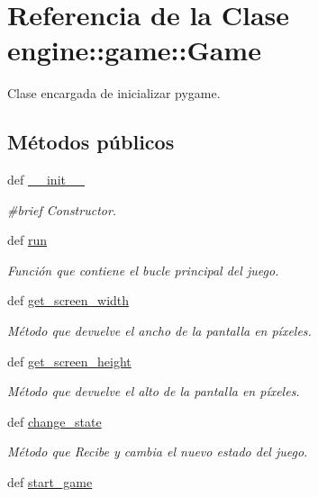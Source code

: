 \hypertarget{classengine_1_1game_1_1Game}{
\section{\-Referencia de la \-Clase engine\-:\-:game\-:\-:\-Game}
\label{classengine_1_1game_1_1Game}
}


\-Clase encargada de inicializar pygame.  


\subsection*{\-Métodos públicos}
\begin{DoxyCompactItemize}
\item 
def \hyperlink{classengine_1_1game_1_1Game_ae313f460dfb01ae1084428e296a3fc8d}{\-\_\-\-\_\-init\-\_\-\-\_\-}
\begin{DoxyCompactList}\small\item\em \#brief \-Constructor. \end{DoxyCompactList}\item 
def \hyperlink{classengine_1_1game_1_1Game_ac5f93b8b93831cc0b91141bb9101e367}{run}
\begin{DoxyCompactList}\small\item\em \-Función que contiene el bucle principal del juego. \end{DoxyCompactList}\item 
def \hyperlink{classengine_1_1game_1_1Game_a58a0f676e7cf4578d47fd9d8eeeaf3b3}{get\-\_\-screen\-\_\-width}
\begin{DoxyCompactList}\small\item\em \-Método que devuelve el ancho de la pantalla en píxeles. \end{DoxyCompactList}\item 
def \hyperlink{classengine_1_1game_1_1Game_afd74e949d78a96ec9322958a153c8795}{get\-\_\-screen\-\_\-height}
\begin{DoxyCompactList}\small\item\em \-Método que devuelve el alto de la pantalla en píxeles. \end{DoxyCompactList}\item 
def \hyperlink{classengine_1_1game_1_1Game_a6e0726a3e362e2d373f2a85430873627}{change\-\_\-state}
\begin{DoxyCompactList}\small\item\em \-Método que \-Recibe y cambia el nuevo estado del juego. \end{DoxyCompactList}\item 
\hypertarget{classengine_1_1game_1_1Game_ac0e27fc60acfd365135d873df6f36f26}{
def \hyperlink{classengine_1_1game_1_1Game_ac0e27fc60acfd365135d873df6f36f26}{start\-\_\-game}}
\label{classengine_1_1game_1_1Game_ac0e27fc60acfd365135d873df6f36f26}


\end{DoxyCompactItemize}

